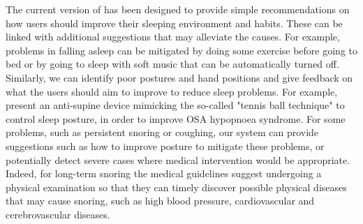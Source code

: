  The current version of {\systemname} has been designed to provide simple recommendations on how users
should improve their sleeping environment and habits. These can be linked with additional suggestions that may alleviate the causes. For
example, problems in falling asleep can be mitigated by doing some exercise before going to bed or by going to sleep with soft music that
can be automatically turned off. Similarly, we can identify poor postures and hand positions and give feedback on what the users should aim
to improve to reduce sleep problems. For example, \cite{posture} present an anti-supine device mimicking the so-called "tennis ball
technique" to control sleep posture, in order to improve OSA hypopnoea syndrome. For some problems, such as persistent snoring or coughing,
our system can provide suggestions such as how to improve posture to mitigate these problems, or potentially detect severe cases where
medical intervention would be appropriate. Indeed, for long-term snoring the medical guidelines suggest undergoing a physical examination
so that they can timely discover possible physical diseases that may cause snoring, such as high blood pressure, cardiovascular and
cerebrovascular diseases.
